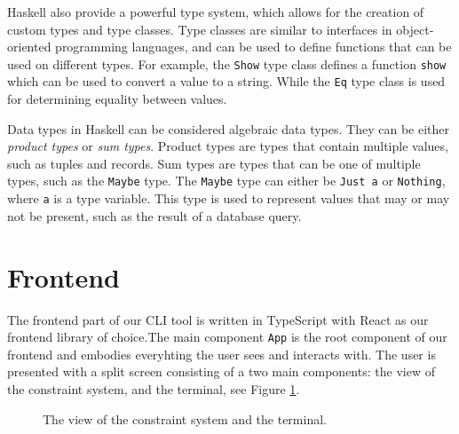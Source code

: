 \documentclass[11pt, a4paper]{article}
\begin{document}
Haskell also provide a powerful type system, which allows for the creation of custom types and type classes. Type classes are similar to interfaces in object-oriented programming languages, and can be used to define functions that can be used on different types. For example, the \texttt{Show} type class defines a function \texttt{show} which can be used to convert a value to a string. While the \texttt{Eq} type class is used for determining equality between values.

Data types in Haskell can be considered algebraic data types. They can be either \textit{product types} or \textit{sum types}. Product types are types that contain multiple values, such as tuples and records. Sum types are types that can be one of multiple types, such as the \texttt{Maybe} type. The \texttt{Maybe} type can either be \texttt{Just a} or \texttt{Nothing}, where \texttt{a} is a type variable. This type is used to represent values that may or may not be present, such as the result of a database query.

\newpage

\section{Frontend}
\label{sec:frontend}
The frontend part of our CLI tool is written in TypeScript \cite{typescript} with React as our frontend library of choice.The main component \texttt{App} is the root component of our frontend and embodies everyhting the user sees and interacts with. The user is presented with a split screen consisting of a two main components: the view of the constraint system, and the terminal, see Figure \ref{fig:view}.

\begin{figure}[h]
    \centering
    \caption{The view of the constraint system and the terminal.}
    \label{fig:view}
\end{figure}
\end{document}
